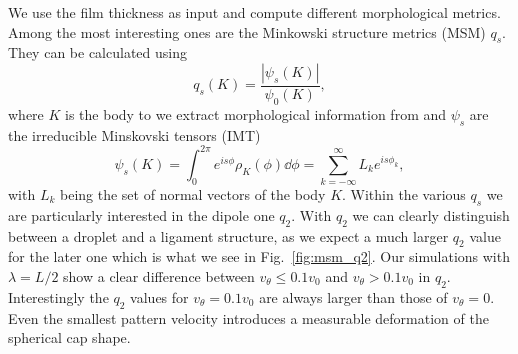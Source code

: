 \documentclass[twocolumn,amsmath,amssymb,showpacs,pre,nofootinbib,superscriptaddress]{revtex4-1} %
\begin{document}
We use the film thickness as input and compute different morphological metrics.
Among the most interesting ones are the Minkowski structure metrics (MSM) $q_s$.
They can be calculated using~\cite{doi:10.1063/1.4774084}
\begin{equation}
    q_s(K) = \frac{|\psi_s(K)|}{\psi_0(K)}, 
\end{equation}
where $K$ is the body to we extract morphological information from and $\psi_s$ are the irreducible Minskovski tensors (IMT)
\begin{equation}
    \psi_s(K) = \int_{0}^{2\pi}e^{is\phi}\rho_K(\phi) \dd\phi = \sum_{k=-\infty}^{\infty} L_k e^{is\phi_k},
\end{equation}
with $L_k$ being the set of normal vectors of the body $K$.
Within the various $q_s$ we are particularly interested in the dipole one $q_2$. 
With $q_2$ we can clearly distinguish between a droplet and a ligament structure, as we expect a much larger $q_2$ value for the later one which is what we see in Fig.~\ref{fig:msm_q2}.
Our simulations with $\lambda = L/2$ show a clear difference between $v_{\theta} \leq 0.1v_0$ and $v_{\theta}>0.1v_0$  in $q_2$.
Interestingly the $q_2$ values for $v_{\theta} = 0.1v_0$ are always larger than those of $v_{\theta} = 0$.
Even the smallest pattern velocity introduces a measurable deformation of the spherical cap shape.
\end{document}
